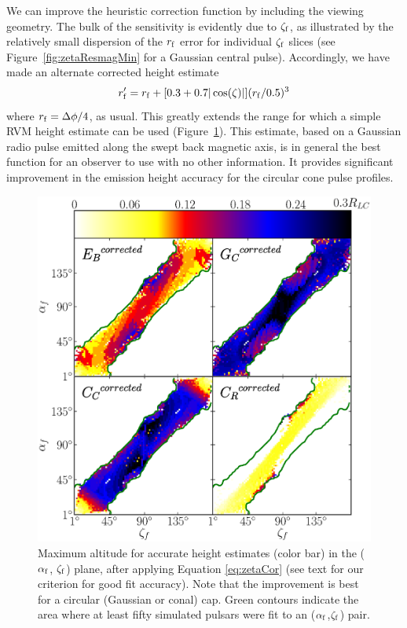 	We can improve the heuristic correction function by including the
viewing geometry. The bulk of the sensitivity is evidently due to $\zeta_{\rm{f}}$,
as illustrated by the relatively small dispersion of the $r_{\rm{f}}$ error for
individual $\zeta_{\rm{f}}$ slices (see Figure~\ref{fig:zetaResmagMin} for
a Gaussian central pulse).
Accordingly, we have made an alternate corrected height estimate
\begin{equation}\label{eq:zetaCor}
r_{\rm{f}}' = r_{\rm{f}}+ [0.3 + 0.7 |\cos(\zeta)| ] (r_{\rm{f}}/0.5)^{3} 
\end{equation}
where $r_{\rm{f}}=\Delta \phi/4$, as usual. This greatly extends the range for which
a simple RVM height estimate can be used (Figure~\ref{fig:SmapCorrected4}). This estimate, based
on a Gaussian radio pulse emitted along the swept back magnetic axis, is
in general the best function for an observer to use with no other information. It provides significant
improvement in the emission height accuracy for the circular cone pulse profiles.

\begin{figure}[t!!]
\begin{center}
\includegraphics[width=.9\textwidth]{chapters/BCWlimitations/figures/SmapCorrected4V2.eps}
\caption[Maximum altitude for accurate height estimates (color bar) in the
($\alpha_{\rm{f}}$, $\zeta_{\rm{f}}$) plane, after applying Equation \ref{eq:zetaCor}]{Maximum altitude for accurate height estimates (color bar) in the 
($\alpha_{\rm{f}}$, $\zeta_{\rm{f}}$) plane, after applying Equation \ref{eq:zetaCor}
(see text for our criterion for good fit accuracy).
Note that the improvement is best for a circular (Gaussian or conal) cap.
Green contours indicate the area where at least fifty simulated pulsars
were fit to an ($\alpha_{\rm{f}}$,$\zeta_{\rm{f}}$) pair.
}
\label{fig:SmapCorrected4}
\end{center}
\end{figure}

